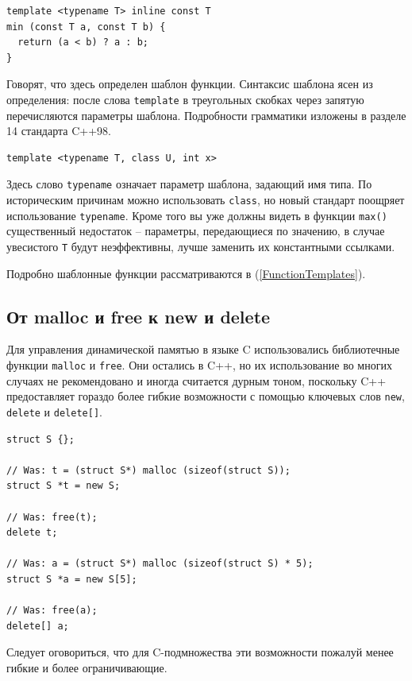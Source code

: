 \documentclass[a4paper,12pt,oneside]{book}
\begin{document}
\begin{lstlisting}
template <typename T> inline const T
min (const T a, const T b) {
  return (a < b) ? a : b;
}
\end{lstlisting}

Говорят, что здесь определен шаблон функции. Синтаксис шаблона ясен из определения: после слова \lstinline!template! в треугольных скобках через запятую перечисляются параметры шаблона. Подробности грамматики изложены в разделе 14 стандарта C++98.

\begin{lstlisting}
template <typename T, class U, int x>
\end{lstlisting}

Здесь слово \lstinline!typename! означает параметр шаблона, задающий имя типа. По историческим причинам можно использовать \lstinline!class!, но новый стандарт поощряет использование \lstinline!typename!. Кроме того вы уже должны видеть в функции \lstinline!max()! существенный недостаток – параметры, передающиеся по значению, в случае увесистого \lstinline!T! будут неэффективны, лучше заменить их константными ссылками.

Подробно шаблонные функции рассматриваются в (\ref{FunctionTemplates}).

\subsection{От malloc и free к new и delete}\label{subsub:newdelete}

Для управления динамической памятью в языке C использовались библиотечные функции \lstinline!malloc! и \lstinline!free!. Они остались в C++, но их использование во многих случаях не рекомендовано и иногда считается дурным тоном, поскольку C++ предоставляет гораздо более гибкие возможности с помощью ключевых слов \lstinline!new!, \lstinline!delete! и \lstinline!delete[]!.

\begin{lstlisting}
struct S {}; 

// Was: t = (struct S*) malloc (sizeof(struct S));
struct S *t = new S; 

// Was: free(t);
delete t; 

// Was: a = (struct S*) malloc (sizeof(struct S) * 5);
struct S *a = new S[5]; 

// Was: free(a);
delete[] a; 
\end{lstlisting}

Следует оговориться, что для C-подмножества эти возможности пожалуй менее гибкие и более ограничивающие.
\end{document}
